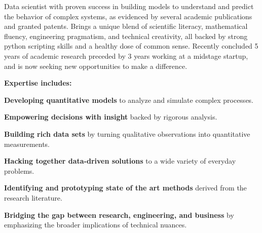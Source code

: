 

\begin{cvparagraph}


Data scientist with proven success in building models to understand and predict the behavior of complex systems, as evidenced by several academic publications and granted patents. Brings a unique blend of scientific literacy, mathematical fluency, engineering pragmatism, and technical creativity, all backed by strong python scripting skills and a healthy dose of common sense. Recently concluded 5 years of academic research preceded by 3 years working at a midstage startup, and is now seeking new opportunities to make a difference.

\textbf{Expertise includes:} \newline
\begin{bulletsonly}{
	\vspace{1.5mm}
	\begin{cvitems}
		\item {\textbf{Developing quantitative models} to analyze and simulate complex processes.\\[-0.8em]}		
		\item {\textbf{Empowering decisions with insight} backed by rigorous analysis.\\[-0.8em]}						
		\item {\textbf{Building rich data sets} by turning qualitative observations into quantitative measurements.\\[-0.8em]}
		\item {\textbf{Hacking together data-driven solutions} to a wide variety of everyday problems.\\[-0.8em]}
		\item {\textbf{Identifying and prototyping state of the art methods} derived from the research literature.\\[-0.8em]}
		\item {\textbf{Bridging the gap between research, engineering, and business} by emphasizing the broader implications of technical nuances.\\[-0.8em]}	    
	\end{cvitems}
	}
\end{bulletsonly}

\vspace{-2.0mm}

\end{cvparagraph}
